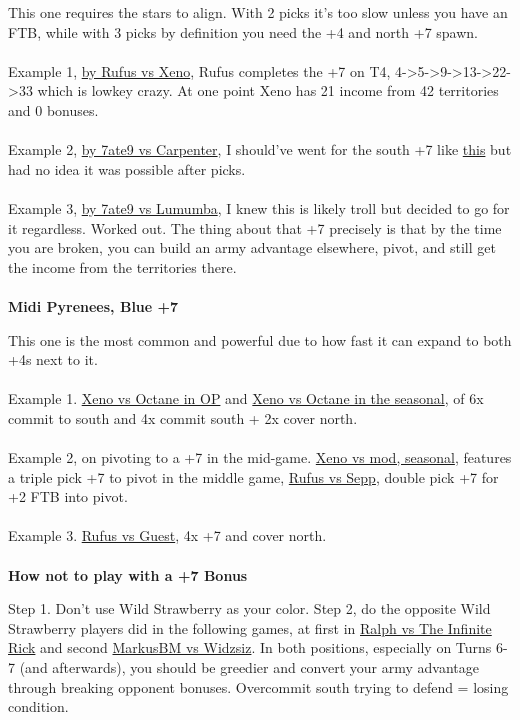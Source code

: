 This one requires the stars to align. With 2 picks it's too slow unless you have an FTB, while with 3 picks by definition you need the +4 and north +7 spawn.
\\
\\
Example 1, \href{https://www.warzone.com/MultiPlayer?GameID=34479630}{by Rufus vs Xeno}, Rufus completes the +7 on T4, 4->5->9->13->22->33 which is lowkey crazy. At one point Xeno has 21 income from 42 territories and 0 bonuses.
\\
\\
Example 2, \href{https://www.warzone.com/MultiPlayer?GameID=40231108}{by 7ate9 vs Carpenter}, I should've went for the south +7 like \href{https://www.warzone.com/MultiPlayer?GameID=40274907}{this} but had no idea it was possible after picks.
\\
\\
Example 3, \href{https://www.warzone.com/MultiPlayer?GameID=41470794}{by 7ate9 vs Lumumba}, I knew this is likely troll but decided to go for it regardless. Worked out. The thing about that +7 precisely is that by the time you are broken, you can build an army advantage elsewhere, pivot, and still get the income from the territories there.
\\
\\
\textbf{Midi Pyrenees, Blue +7}

This one is the most common and powerful due to how fast it can expand to both +4s next to it.
\\
\\
Example 1. \href{https://www.warzone.com/MultiPlayer?GameID=41470788}{Xeno vs Octane in OP} and \href{https://www.warzone.com/MultiPlayer?GameID=32934772}{Xeno vs Octane in the seasonal}, of 6x commit to south and 4x commit south + 2x cover north.
\\
\\
Example 2, on pivoting to a +7 in the mid-game. \href{https://www.warzone.com/MultiPlayer?GameID=32666150}{Xeno vs mod, seasonal}, features a triple pick +7 to pivot in the middle game, \href{https://www.warzone.com/MultiPlayer?GameID=34614356}{Rufus vs Sepp}, double pick +7 for +2 FTB into pivot.
\\
\\
Example 3. \href{https://www.warzone.com/MultiPlayer?GameID=38140305}{Rufus vs Guest}, 4x +7 and cover north.
\\
\\
\textbf{How not to play with a +7 Bonus}

Step 1. Don't use Wild Strawberry as your color. Step 2, do the opposite Wild Strawberry players did in the following games, at first in \href{https://www.warzone.com/MultiPlayer?GameID=26670234}{Ralph vs The Infinite Rick} and second \href{https://www.warzone.com/MultiPlayer?GameID=41495186}{MarkusBM vs Widzsiz}. In both positions, especially on Turns 6-7 (and afterwards), you should be greedier and convert your army advantage through breaking opponent bonuses. Overcommit south trying to defend = losing condition.








